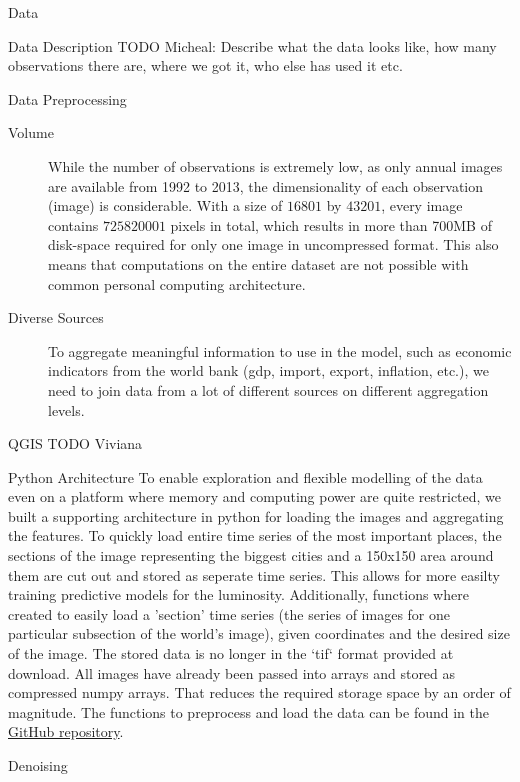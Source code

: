 \documentclass[12pt,fleqn,leqno,letterpaper]{article}
\begin{document}
\begin{section}{Data}
  \begin{subsection}{Data Description}
    TODO Micheal: Describe what the data looks like, how many observations there are, where we got it, who else has used it etc.
  \end{subsection}
  \begin{subsection}{Data Preprocessing}
    \begin{description}
      \item[Volume]{While the number of observations is extremely low, as only annual images are available from 1992 to 2013, the dimensionality of each observation (image) is considerable. With a size of $16801$ by $43201$, every image contains $725820001$ pixels in total, which results in more than 700MB of disk-space required for only one image in uncompressed format. This also means that computations on the entire dataset are not possible with common personal computing architecture.}
      \item[Diverse Sources]{To aggregate meaningful information to use in the model, such as economic indicators from the world bank (gdp, import, export, inflation, etc.), we need to join data from a lot of different sources on different aggregation levels.}
    \end{description}
    \begin{subsubsection}{QGIS}
      TODO Viviana
    \end{subsubsection}
    \begin{subsubsection}{Python Architecture}
      To enable exploration and flexible modelling of the data even on a platform where memory and computing power are quite restricted, we built a supporting architecture in python for loading the images and aggregating the features. To quickly load entire time series of the most important places, the sections of the image representing the biggest cities and a 150x150 area around them are cut out and stored as seperate time series. This allows for more easilty training predictive models for the luminosity. Additionally, functions where created to easily load a 'section' time series (the series of images for one particular subsection of the world's image), given coordinates and the desired size of the image. The stored data is no longer in the `tif` format provided at download. All images have already been passed into arrays and stored as compressed numpy arrays. That reduces the required storage space by an order of magnitude. The functions to preprocess and load the data can be found in the \hyperref[www.github.com/westermann/luminosity]{GitHub repository}.
    \end{subsubsection}
    \begin{subsubsection}{Denoising}
    \end{subsubsection}
  \end{subsection}
\end{section}
\end{document}
